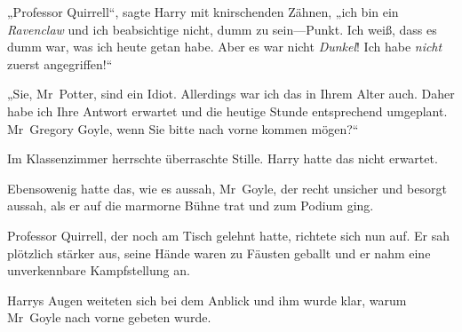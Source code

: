 „Professor Quirrell“, sagte Harry mit knirschenden Zähnen, „ich bin ein \emph{Ravenclaw} und ich beabsichtige nicht, dumm zu sein—Punkt. Ich weiß, dass es dumm war, was ich heute getan habe. Aber es war nicht \emph{Dunkel}! Ich habe \emph{nicht} zuerst angegriffen!“

„Sie, Mr~Potter, sind ein Idiot. Allerdings war ich das in Ihrem Alter auch. Daher habe ich Ihre Antwort erwartet und die heutige Stunde entsprechend umgeplant. Mr~Gregory Goyle, wenn Sie bitte nach vorne kommen mögen?“

Im Klassenzimmer herrschte überraschte Stille. Harry hatte das nicht erwartet.

Ebensowenig hatte das, wie es aussah, Mr~Goyle, der recht unsicher und besorgt aussah, als er auf die marmorne Bühne trat und zum Podium ging.

Professor Quirrell, der noch am Tisch gelehnt hatte, richtete sich nun auf. Er sah plötzlich stärker aus, seine Hände waren zu Fäusten geballt und er nahm eine unverkennbare Kampfstellung an.

Harrys Augen weiteten sich bei dem Anblick und ihm wurde klar, warum Mr~Goyle nach vorne gebeten wurde.

